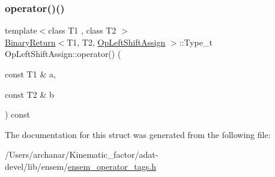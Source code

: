 \subsubsection{\texorpdfstring{operator()()}{operator()()}\hspace{0.1cm}{\footnotesize\ttfamily [3/3]}}
{\footnotesize\ttfamily template$<$class T1 , class T2 $>$ \\
\mbox{\hyperlink{structBinaryReturn}{Binary\+Return}}$<$T1, T2, \mbox{\hyperlink{structOpLeftShiftAssign}{Op\+Left\+Shift\+Assign}} $>$\+::Type\+\_\+t Op\+Left\+Shift\+Assign\+::operator() (\begin{DoxyParamCaption}\item[{const T1 \&}]{a,  }\item[{const T2 \&}]{b }\end{DoxyParamCaption}) const\hspace{0.3cm}{\ttfamily [inline]}}



The documentation for this struct was generated from the following file\+:\begin{DoxyCompactItemize}
\item 
/\+Users/archanar/\+Kinematic\+\_\+factor/adat-\/devel/lib/ensem/\mbox{\hyperlink{adat-devel_2lib_2ensem_2ensem__operator__tags_8h}{ensem\+\_\+operator\+\_\+tags.\+h}}\end{DoxyCompactItemize}
